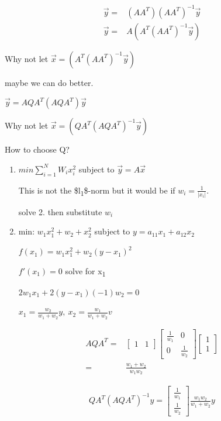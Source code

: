 \documentclass[11pt]{article}
\begin{document}
\begin{equation}
\begin{split}
\vec y = & (A A^T) (A A^T)^{-1} \vec y\\
\vec y = & A (A^T (A A^T)^{-1} \vec y)
\end{split}
\end{equation}

Why not let \(\vec x = (A^T (A A^T)^{-1} \vec y)\)

maybe we can do better.

\(\vec y = A Q A^T (A Q A^T) \vec y\)

Why not let \(\vec x = (Q A^T (A Q A^T)^{-1} \vec y)\)

How to choose Q?

\begin{enumerate}
\item \(min \sum_{i = 1}^{N} W_i x_i^2\) subject to \(\vec y = A \vec x\)

This is not the \$l\textsubscript{1}\$-norm but it would be if \(w_i = \frac{1}{|x_i|}\).

solve 2. then substitute \(w_i\)

\item min: \(w_1 x_1^2 + w_2 + x_2^2\) subject to \(y = a_{11} x_1 + a_{12} x_2\)

\(f(x_1) = w_1 x_1^2 + w_2 (y - x_1)^2\)

\(f'(x_1) = 0\) solve for x\textsubscript{1}

\(2 w_1 x_1 + 2 (y - x_1)(-1)w_2 = 0\)

\(x_1 = \frac{w_2}{w_1 + w_2} y, \ x_2 = \frac{w_1}{w_1 + w_2}v\)
\end{enumerate}


\begin{equation}
\begin{split}
AQA^T = & \begin{bmatrix}1 & 1 \end{bmatrix} \begin{bmatrix} \frac{1}{w_1} & 0 \\ 0 & \frac{1}{w_2} \end{bmatrix} \begin{bmatrix}1\\ 1 \end{bmatrix}\\
= & \frac{w_1 + w_2}{w_1 w_2}
\end{split}
\end{equation}

\begin{equation}
\begin{split}
QA^T(AQA^T)^{-1} y = \begin{bmatrix} \frac{1}{w_1}\\ \frac{1}{w_2} \end{bmatrix} \frac{w_1 w_2}{w_1 + w_2} y
\end{split}
\end{equation}
\end{document}
